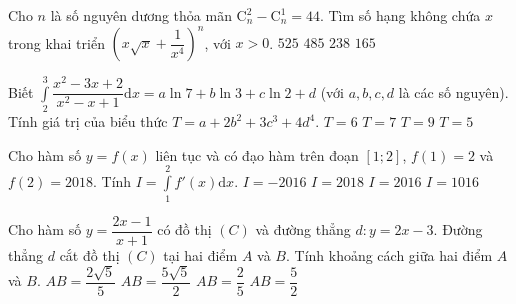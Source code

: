 \begin{ex}%
	Cho $ n $ là số nguyên dương thỏa mãn $ \mathrm{C}_{n}^{2}-\mathrm{C}_{n}^{1}=44 $. Tìm số hạng không chứa $ x $ trong khai triển $ \left(x\sqrt{x}+\dfrac{1}{x^{4}} \right)^{n}  $, với $ x>0 $.
	\choice
	{$ 525 $}
	{$ 485 $}
	{$ 238 $}
	{\True $ 165 $}
\end{ex}
\begin{ex}%
	Biết $ \displaystyle\int\limits_{2}^{3}\dfrac{x^{2}-3x+2}{x^{2}-x+1}\mathrm{d}x=a\ln 7+b\ln 3+c\ln 2+d $ (với $ a,b,c,d $ là các số nguyên). Tính giá trị của biểu thức $ T=a+2b^{2}+3c^{3}+4d^{4} $.
	\choice
	{$ T=6 $}
	{$ T=7 $}
	{$ T=9 $}
	{\True $ T=5 $}
\end{ex}
\begin{ex}%
	Cho hàm số $ y=f(x) $ liên tục và có đạo hàm trên đoạn $ [1;2] $, $ f(1)=2 $ và $ f(2)=2018 $. Tính $ I=\displaystyle\int\limits_{1}^{2}f'(x)\mathrm{d}x $.
	\choice
	{$ I=-2016 $}
	{$ I=2018 $}
	{\True $ I=2016 $}
	{$ I=1016 $}
\end{ex}
\begin{ex}%
	Cho hàm số $ y=\dfrac{2x-1}{x+1} $ có đồ thị $ (C) $ và đường thẳng $ d\colon y=2x-3 $. Đường thẳng $ d $ cắt đồ thị $ (C) $ tại hai điểm $ A $ và $ B $. Tính khoảng cách giữa hai điểm $ A $ và $ B $.
	\choice
	{$ AB=\dfrac{2\sqrt{5}}{5} $}
	{\True $ AB=\dfrac{5\sqrt{5}}{2} $}
	{$ AB=\dfrac{2}{5} $}
	{$ AB=\dfrac{5}{2} $}
\end{ex}
